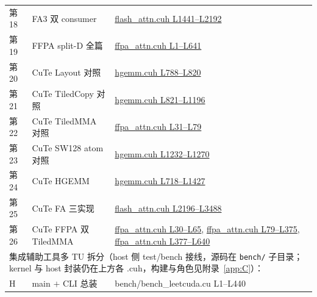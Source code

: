 \begin{longtable}{llp{7.2cm}}
第18 & FA3 双 consumer & \href{https://github.com/xlite-dev/LeetCUDA/blob/6cd32deca683d6c4aae2011988c9f4a35bc5f528/kernels/interview/flash_attn.cuh#L1441-L2192}{flash\_attn.cuh L1441--L2192} \\
第19 & FFPA split-D 全篇 & \href{https://github.com/xlite-dev/LeetCUDA/blob/6cd32deca683d6c4aae2011988c9f4a35bc5f528/kernels/interview/ffpa_attn.cuh#L1-L641}{ffpa\_attn.cuh L1--L641} \\
第20 & CuTe Layout 对照 & \href{https://github.com/xlite-dev/LeetCUDA/blob/6cd32deca683d6c4aae2011988c9f4a35bc5f528/kernels/interview/hgemm.cuh#L788-L820}{hgemm.cuh L788--L820} \\
第21 & CuTe TiledCopy 对照 & \href{https://github.com/xlite-dev/LeetCUDA/blob/6cd32deca683d6c4aae2011988c9f4a35bc5f528/kernels/interview/hgemm.cuh#L821-L1196}{hgemm.cuh L821--L1196} \\
第22 & CuTe TiledMMA 对照 & \href{https://github.com/xlite-dev/LeetCUDA/blob/6cd32deca683d6c4aae2011988c9f4a35bc5f528/kernels/interview/ffpa_attn.cuh#L31-L79}{ffpa\_attn.cuh L31--L79} \\
第23 & CuTe SW128 atom 对照 & \href{https://github.com/xlite-dev/LeetCUDA/blob/6cd32deca683d6c4aae2011988c9f4a35bc5f528/kernels/interview/hgemm.cuh#L1232-L1270}{hgemm.cuh L1232--L1270} \\
第24 & CuTe HGEMM & \href{https://github.com/xlite-dev/LeetCUDA/blob/6cd32deca683d6c4aae2011988c9f4a35bc5f528/kernels/interview/hgemm.cuh#L718-L1427}{hgemm.cuh L718--L1427} \\
第25 & CuTe FA 三实现 & \href{https://github.com/xlite-dev/LeetCUDA/blob/6cd32deca683d6c4aae2011988c9f4a35bc5f528/kernels/interview/flash_attn.cuh#L2196-L3488}{flash\_attn.cuh L2196--L3488} \\
第26 & CuTe FFPA 双 TiledMMA & \href{https://github.com/xlite-dev/LeetCUDA/blob/6cd32deca683d6c4aae2011988c9f4a35bc5f528/kernels/interview/ffpa_attn.cuh#L30-L65}{ffpa\_attn.cuh L30--L65}, \href{https://github.com/xlite-dev/LeetCUDA/blob/6cd32deca683d6c4aae2011988c9f4a35bc5f528/kernels/interview/ffpa_attn.cuh#L79-L375}{ffpa\_attn.cuh L79--L375}, \href{https://github.com/xlite-dev/LeetCUDA/blob/6cd32deca683d6c4aae2011988c9f4a35bc5f528/kernels/interview/ffpa_attn.cuh#L377-L640}{ffpa\_attn.cuh L377--L640} \\
\multicolumn{3}{l}{\footnotesize 集成辅助工具多 TU 拆分（host 侧 test/bench 接线，源码在 \texttt{bench/} 子目录；kernel 与 host 封装仍在上方各 .cuh，构建与角色见附录~\ref{app:C}）：} \\
H & main $+$ CLI 总装 & bench/bench\_leetcuda.cu L1--L440 \\

\end{longtable}
